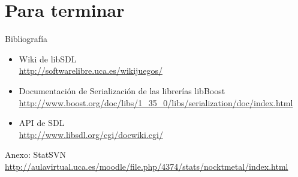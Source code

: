 \documentclass[9pt,xcolor=svgnames]{beamer}
\begin{document}
  
 \section{Para terminar}

 \begin{frame}{Bibliografía}
   \transdissolve

  \begin{itemize}
   \item Wiki de libSDL\\
	 \url{http://softwarelibre.uca.es/wikijuegos/}
   \item Documentación de Serialización de las librerías libBoost\\
	 \url{http://www.boost.org/doc/libs/1_35_0/libs/serialization/doc/index.html}
   \item API de SDL\\
	 \url{http://www.libsdl.org/cgi/docwiki.cgi/}
  \end{itemize}
  

  \begin{block}{Anexo: StatSVN}
   \url{http://aulavirtual.uca.es/moodle/file.php/4374/stats/nocktmetal/index.html}
  \end{block}

 \end{frame}

  

  
\end{document}
